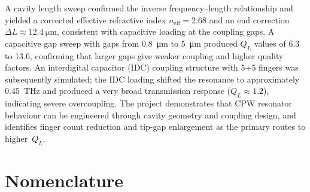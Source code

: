 \documentclass[12pt,a4paper]{article}
\begin{document}
A cavity length sweep confirmed the inverse frequency--length relationship
and yielded a corrected effective refractive index $n_{\mathrm{eff}} = 2.68$
and an end correction $\Delta L \approx \SI{12.4}{\micro\metre}$, consistent
with capacitive loading at the coupling gaps. A capacitive gap sweep with
gaps from \SI{0.8}{\micro\metre} to \SI{5}{\micro\metre} produced $Q_L$
values of 6.3 to 13.6, confirming that larger gaps give weaker coupling and
higher quality factors. An interdigital capacitor (IDC) coupling structure
with 5+5 fingers was subsequently simulated; the IDC loading shifted the
resonance to approximately \SI{0.45}{\tera\hertz} and produced a very broad
transmission response ($Q_L \approx 1.2$), indicating severe overcoupling.
The project demonstrates that CPW resonator behaviour can be engineered
through cavity geometry and coupling design, and identifies finger count
reduction and tip-gap enlargement as the primary routes to higher~$Q_L$.

\newpage
\tableofcontents
\newpage
\listoffigures
\newpage
\listoftables

\newpage
\section*{Nomenclature}
\end{document}
